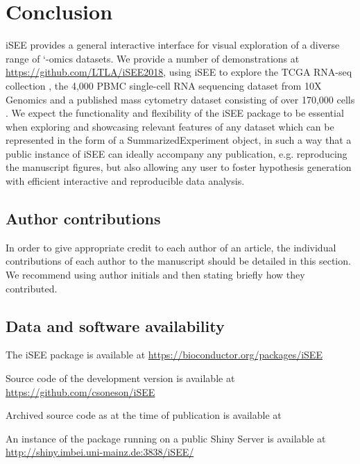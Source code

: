 \documentclass[10pt,a4paper,twocolumn]{article}
\begin{document}
\section*{Conclusion}
iSEE provides a general interactive interface for visual exploration of a diverse range of `-omics datasets.
We provide a number of demonstrations at \url{https://github.com/LTLA/iSEE2018}, using iSEE to explore the TCGA RNA-seq collection \citep{piccolo2015TCGA}, the 4,000 PBMC single-cell RNA sequencing dataset from 10X Genomics \citep{zheng2017massively} and a published mass cytometry dataset consisting of over 170,000 cells \citep{bodenmiller2012cytof}.
We expect the functionality and flexibility of the iSEE package to be essential when exploring and showcasing relevant features of any dataset which can be represented in the form of a SummarizedExperiment object, in such a way that a public instance of iSEE can ideally accompany any publication, e.g. reproducing the manuscript figures, but also allowing any user to foster hypothesis generation with efficient interactive and reproducible data analysis.

\subsection*{Author contributions}
In order to give appropriate credit to each author of an article, the individual
contributions of each author to the manuscript should be detailed in this section. We
recommend using author initials and then stating briefly how they contributed.

\subsection*{Data and software availability}
The iSEE package is available at \url{https://bioconductor.org/packages/iSEE}

Source code of the development version is available at \url{https://github.com/csoneson/iSEE}

Archived source code as at the time of publication is available at %

An instance of the package running on a public Shiny Server is available at \url{http://shiny.imbei.uni-mainz.de:3838/iSEE/}

\end{document}
